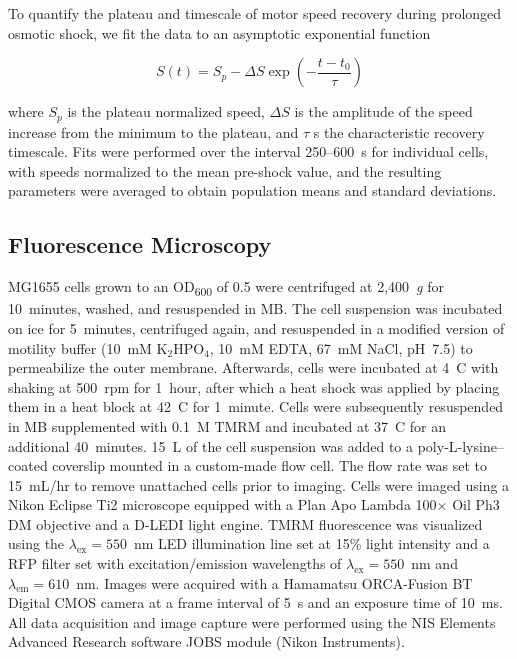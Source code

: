 \documentclass[twocolumn]{biophys-new}%
\begin{document}
To quantify the plateau and timescale of motor speed recovery during prolonged osmotic shock, we fit the data to an asymptotic exponential function

\begin{equation}
    S(t) = S_p - \Delta S\exp\!\left(-\dfrac{t - t_0}{\tau}\right)
    \label{eq:exponetial-curve}
\end{equation}

where $S_p$ is the plateau normalized speed, $\Delta S$ is the amplitude of the speed increase from the minimum to the plateau, and $\tau$ s the characteristic recovery timescale. Fits were performed over the interval 250--600~s for individual cells, with speeds normalized to the mean pre-shock value, and the resulting parameters were averaged to obtain population means and standard deviations.

\subsection*{\textbf{Fluorescence Microscopy}}
MG1655 cells grown to an OD\textsubscript{600} of 0.5 were centrifuged at 2,400~\textit{g} for 10~minutes, washed, and resuspended in MB. The cell suspension was incubated on ice for 5~minutes, centrifuged again, and resuspended in a modified version of motility buffer (10~mM K$_2$HPO$_4$, 10~mM EDTA, 67~mM NaCl, pH~7.5) to permeabilize the outer membrane. Afterwards, cells were incubated at 4~\textdegree C with shaking at 500~rpm for 1~hour, after which a heat shock was applied by placing them in a heat block at 42~\textdegree C for 1~minute. Cells were subsequently resuspended in MB supplemented with 0.1~\textmu M TMRM and incubated at 37~\textdegree C for an additional 40~minutes. 15~\textmu L of the cell suspension was added to a poly-L-lysine–coated coverslip mounted in a custom-made flow cell. The flow rate was set to 15~mL/hr to remove unattached cells prior to imaging. Cells were imaged using a Nikon Eclipse Ti2 microscope equipped with a Plan Apo Lambda 100$\times$ Oil Ph3 DM objective and a D-LEDI light engine. TMRM fluorescence was visualized using the $\lambda_{\mathrm{ex}} = 550$~nm LED illumination line set at 15\% light intensity and  a RFP filter set with excitation/emission wavelengths of $\lambda_{\mathrm{ex}} = 550$~nm and $\lambda_{\mathrm{em}} = 610$~nm. Images were acquired with a Hamamatsu ORCA-Fusion BT Digital CMOS camera at a frame interval of 5~s and an exposure time of 10~ms. All data acquisition and image capture were performed using the NIS Elements Advanced Research software JOBS module (Nikon Instruments).
\end{document}
